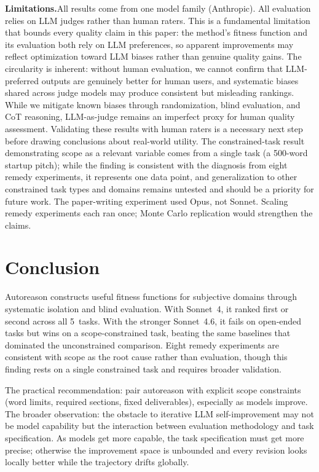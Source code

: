 \documentclass[10pt,twocolumn]{article}
\begin{document}
\textbf{Limitations.}\enspace All results come from one model family (Anthropic). All evaluation relies on LLM judges rather than human raters. This is a fundamental limitation that bounds every quality claim in this paper: the method's fitness function and its evaluation both rely on LLM preferences, so apparent improvements may reflect optimization toward LLM biases rather than genuine quality gains. The circularity is inherent: without human evaluation, we cannot confirm that LLM-preferred outputs are genuinely better for human users, and systematic biases shared across judge models may produce consistent but misleading rankings. While we mitigate known biases through randomization, blind evaluation, and CoT reasoning, LLM-as-judge remains an imperfect proxy for human quality assessment. Validating these results with human raters is a necessary next step before drawing conclusions about real-world utility. The constrained-task result demonstrating scope as a relevant variable comes from a single task (a 500-word startup pitch); while the finding is consistent with the diagnosis from eight remedy experiments, it represents one data point, and generalization to other constrained task types and domains remains untested and should be a priority for future work. The paper-writing experiment used Opus, not Sonnet. Scaling remedy experiments each ran once; Monte Carlo replication would strengthen the claims.

\section{Conclusion}

Autoreason constructs useful fitness functions for subjective domains through systematic isolation and blind evaluation. With Sonnet~4, it ranked first or second across all 5~tasks. With the stronger Sonnet~4.6, it fails on open-ended tasks but wins on a scope-constrained task, beating the same baselines that dominated the unconstrained comparison. Eight remedy experiments are consistent with scope as the root cause rather than evaluation, though this finding rests on a single constrained task and requires broader validation.

The practical recommendation: pair autoreason with explicit scope constraints (word limits, required sections, fixed deliverables), especially as models improve. The broader observation: the obstacle to iterative LLM self-improvement may not be model capability but the interaction between evaluation methodology and task specification. As models get more capable, the task specification must get more precise; otherwise the improvement space is unbounded and every revision looks locally better while the trajectory drifts globally.
\end{document}
